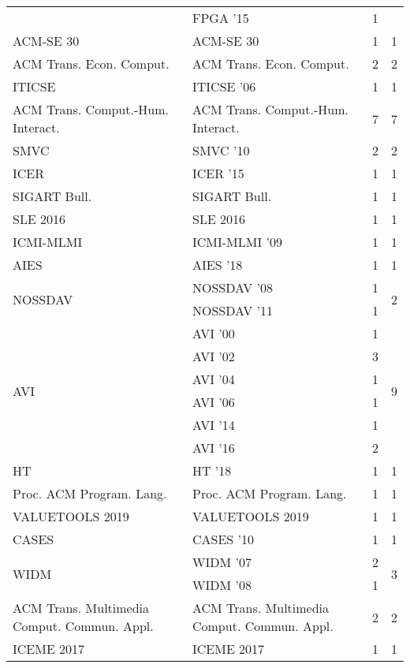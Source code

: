 \begin{table*}[t]
\begin{tabular}{llrr}
& FPGA '15 & 1 &\\
\multirow{1}{*}{ACM-SE 30} & ACM-SE 30 & 1 & \multirow{1}{*}{1}\\
\multirow{1}{*}{ACM Trans. Econ. Comput.} & ACM Trans. Econ. Comput. & 2 & \multirow{1}{*}{2}\\
\multirow{1}{*}{ITICSE } & ITICSE '06 & 1 & \multirow{1}{*}{1}\\
\multirow{1}{*}{ACM Trans. Comput.-Hum. Interact.} & ACM Trans. Comput.-Hum. Interact. & 7 & \multirow{1}{*}{7}\\
\multirow{1}{*}{SMVC } & SMVC '10 & 2 & \multirow{1}{*}{2}\\
\multirow{1}{*}{ICER } & ICER '15 & 1 & \multirow{1}{*}{1}\\
\multirow{1}{*}{SIGART Bull.} & SIGART Bull. & 1 & \multirow{1}{*}{1}\\
\multirow{1}{*}{SLE 2016} & SLE 2016 & 1 & \multirow{1}{*}{1}\\
\multirow{1}{*}{ICMI-MLMI } & ICMI-MLMI '09 & 1 & \multirow{1}{*}{1}\\
\multirow{1}{*}{AIES } & AIES '18 & 1 & \multirow{1}{*}{1}\\
\multirow{2}{*}{NOSSDAV } & NOSSDAV '08 & 1 & \multirow{2}{*}{2}\\
& NOSSDAV '11 & 1 &\\
\multirow{6}{*}{AVI } & AVI '00 & 1 & \multirow{6}{*}{9}\\
& AVI '02 & 3 &\\
& AVI '04 & 1 &\\
& AVI '06 & 1 &\\
& AVI '14 & 1 &\\
& AVI '16 & 2 &\\
\multirow{1}{*}{HT } & HT '18 & 1 & \multirow{1}{*}{1}\\
\multirow{1}{*}{Proc. ACM Program. Lang.} & Proc. ACM Program. Lang. & 1 & \multirow{1}{*}{1}\\
\multirow{1}{*}{VALUETOOLS 2019} & VALUETOOLS 2019 & 1 & \multirow{1}{*}{1}\\
\multirow{1}{*}{CASES } & CASES '10 & 1 & \multirow{1}{*}{1}\\
\multirow{2}{*}{WIDM } & WIDM '07 & 2 & \multirow{2}{*}{3}\\
& WIDM '08 & 1 &\\
\multirow{1}{*}{ACM Trans. Multimedia Comput. Commun. Appl.} & ACM Trans. Multimedia Comput. Commun. Appl. & 2 & \multirow{1}{*}{2}\\
\multirow{1}{*}{ICEME 2017} & ICEME 2017 & 1 & \multirow{1}{*}{1}\\

\end{tabular}
\end{table*}
